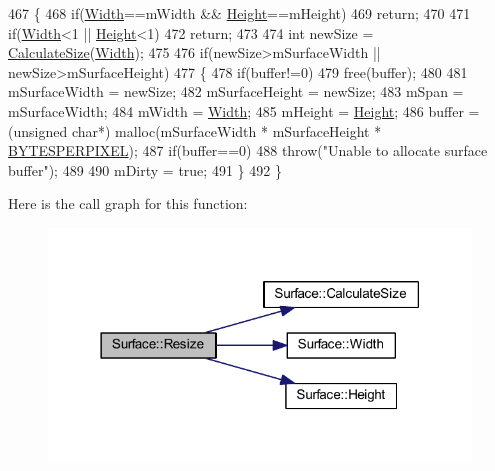 \begin{DoxyCode}
467 \{
468     \textcolor{keywordflow}{if}(\hyperlink{class_surface_ae76d7c2fa208df6979a77cc60e8105c0}{Width}==mWidth && \hyperlink{class_surface_ab901f48d51b3fd427415b580dc15518c}{Height}==mHeight)
469         \textcolor{keywordflow}{return};
470 
471     \textcolor{keywordflow}{if}(\hyperlink{class_surface_ae76d7c2fa208df6979a77cc60e8105c0}{Width}<1 || \hyperlink{class_surface_ab901f48d51b3fd427415b580dc15518c}{Height}<1)
472         \textcolor{keywordflow}{return};
473 
474     \textcolor{keywordtype}{int} newSize = \hyperlink{class_surface_aeb8a8540f415a4d29c440667e8532e91}{CalculateSize}(\hyperlink{class_surface_ae76d7c2fa208df6979a77cc60e8105c0}{Width});
475 
476     \textcolor{keywordflow}{if}(newSize>mSurfaceWidth || newSize>mSurfaceHeight)
477     \{
478         \textcolor{keywordflow}{if}(buffer!=0)
479             free(buffer);
480 
481         mSurfaceWidth = newSize;
482         mSurfaceHeight = newSize;
483         mSpan = mSurfaceWidth;
484         mWidth = \hyperlink{class_surface_ae76d7c2fa208df6979a77cc60e8105c0}{Width};
485         mHeight = \hyperlink{class_surface_ab901f48d51b3fd427415b580dc15518c}{Height};
486         buffer = (\textcolor{keywordtype}{unsigned} \textcolor{keywordtype}{char}*) malloc(mSurfaceWidth * mSurfaceHeight * 
      \hyperlink{supportcode_8h_afb291d1c2072afc3383bc2e688e75d3b}{BYTESPERPIXEL});
487         \textcolor{keywordflow}{if}(buffer==0)
488             \textcolor{keywordflow}{throw}(\textcolor{stringliteral}{"Unable to allocate surface buffer"});
489 
490         mDirty = \textcolor{keyword}{true};
491     \}
492 \}
\end{DoxyCode}
Here is the call graph for this function\+:
\nopagebreak
\begin{figure}[H]
\begin{center}
\leavevmode
\includegraphics[width=318pt]{class_surface_a5e45e936e3057fa1ddad0c7924767005_cgraph}
\end{center}
\end{figure}
\mbox{\label{class_surface_a377c59f6ef131d4b879cda93578a3efa}} 
